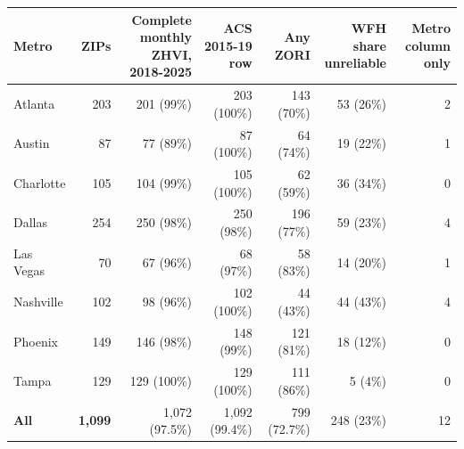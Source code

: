 \footnotesize\setlength{\tabcolsep}{4pt}
\begin{tabular}{lrrrrrr}
\toprule
Metro & ZIPs & \shortstack[r]{Complete monthly\\ZHVI, 2018-2025} & \shortstack[r]{ACS 2015-19\\row} & \shortstack[r]{Any\\ZORI} & \shortstack[r]{WFH share\\unreliable} & \shortstack[r]{Metro column\\only} \\
\midrule
Atlanta & 203 & 201 (99\%) & 203 (100\%) & 143 (70\%) & 53 (26\%) & 2 \\
Austin & 87 & 77 (89\%) & 87 (100\%) & 64 (74\%) & 19 (22\%) & 1 \\
Charlotte & 105 & 104 (99\%) & 105 (100\%) & 62 (59\%) & 36 (34\%) & 0 \\
Dallas & 254 & 250 (98\%) & 250 (98\%) & 196 (77\%) & 59 (23\%) & 4 \\
Las Vegas & 70 & 67 (96\%) & 68 (97\%) & 58 (83\%) & 14 (20\%) & 1 \\
Nashville & 102 & 98 (96\%) & 102 (100\%) & 44 (43\%) & 44 (43\%) & 4 \\
Phoenix & 149 & 146 (98\%) & 148 (99\%) & 121 (81\%) & 18 (12\%) & 0 \\
Tampa & 129 & 129 (100\%) & 129 (100\%) & 111 (86\%) & 5 (4\%) & 0 \\
\textbf{All} & \textbf{1,099} & 1,072 (97.5\%) & 1,092 (99.4\%) & 799 (72.7\%) & 248 (23\%) & 12 \\
\bottomrule
\end{tabular}
